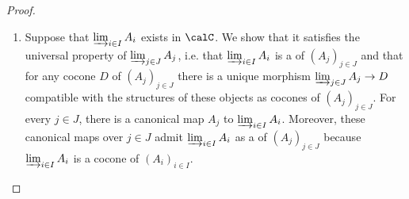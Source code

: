 \begin{proof}
    \begin{enumerate}
        \item Suppose that $\varinjlim_{i \in I} A_i$ exists in $\calC$. We show that it satisfies the universal property of $\varinjlim_{j \in J} A_j$, i.e. that $\varinjlim_{i \in I} A_i$ is a  of $(A_j)_{j \in J}$ and that for any cocone $D$ of $(A_j)_{j \in J}$ there is a unique morphism $\varinjlim_{j \in J} A_j \to D$ compatible with the structures of these objects as cocones of $(A_j)_{j \in J}$. For every $j \in J$, there is a canonical map $A_j$ to $\varinjlim_{i \in I} A_i$. Moreover, these canonical maps over $j \in J$ admit $\varinjlim_{i \in I} A_i$ as a  of $(A_j)_{j \in J}$ because $\varinjlim_{i \in I} A_i$ is a cocone of $(A_i)_{i \in I}$. 
        

\end{enumerate}
\end{proof}
